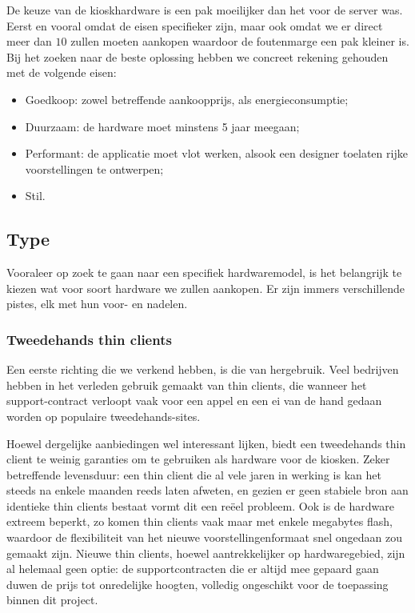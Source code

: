 De keuze van de kioskhardware is een pak moeilijker dan het voor de server was. Eerst en vooral omdat de eisen specifieker zijn, maar ook omdat we er direct meer dan $10$ zullen moeten aankopen waardoor de foutenmarge een pak kleiner is. Bij het zoeken naar de beste oplossing hebben we concreet rekening gehouden met de volgende eisen:
\begin{itemize}
\item Goedkoop: zowel betreffende aankoopprijs, als energieconsumptie;
\item Duurzaam: de hardware moet minstens 5 jaar meegaan;
\item Performant: de applicatie moet vlot werken, alsook een designer toelaten rijke voorstellingen te ontwerpen;
\item Stil.
\end{itemize}

\subsection{Type}

Vooraleer op zoek te gaan naar een specifiek hardwaremodel, is het belangrijk te kiezen wat voor soort hardware we zullen aankopen. Er zijn immers verschillende pistes, elk met hun voor- en nadelen.

\subsubsection{Tweedehands thin clients}

Een eerste richting die we verkend hebben, is die van hergebruik. Veel bedrijven hebben in het verleden gebruik gemaakt van thin clients, die wanneer het support-contract verloopt vaak voor een appel en een ei van de hand gedaan worden op populaire tweedehands-sites.

Hoewel dergelijke aanbiedingen wel interessant lijken, biedt een tweedehands thin client te weinig garanties om te gebruiken als hardware voor de kiosken. Zeker betreffende levensduur: een thin client die al vele jaren in werking is kan het steeds na enkele maanden reeds laten afweten, en gezien er geen stabiele bron aan identieke thin clients bestaat vormt dit een reëel probleem. Ook is de hardware extreem beperkt, zo komen thin clients vaak maar met enkele megabytes flash, waardoor de flexibiliteit van het nieuwe voorstellingenformaat snel ongedaan zou gemaakt zijn. Nieuwe thin clients, hoewel aantrekkelijker op hardwaregebied, zijn al helemaal geen optie: de supportcontracten die er altijd mee gepaard gaan duwen de prijs tot onredelijke hoogten, volledig ongeschikt voor de toepassing binnen dit project.

